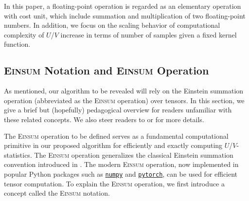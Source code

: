 \documentclass[twoside,11pt]{article}
\def\Einsum{\textsc{Einsum}}
\newcommand{\libref}[2]{\href{#2}{\texttt{#1}}}
\newcommand{\numpy}{\libref{numpy}{https://numpy.org/}}
\newcommand{\torch}{\libref{pytorch}{https://pytorch.org/}}
\begin{document}
In this paper, a floating-point operation is regarded as an elementary operation with cost unit, which include summation and multiplication of two floating-point numbers. In addition, we focus on the scaling behavior of computational complexity of $U$/$V$ increase in terms of number of samples given a fixed kernel function.
\fi

\subsection{{\normalfont\Einsum{}} Notation and {\normalfont\Einsum{}} Operation}
\label{sec:pre_tensor_contraction}

As mentioned, our algorithm to be revealed will rely on the Einstein summation operation (abbreviated as the \Einsum{} operation) over tensors. In this section, we give a brief but (hopefully) pedagogical overview for readers unfamiliar with these related concepts. We also steer readers to \citet{klaus2023compiling} or \citet{blacher2024einsum} for more details. %

The \Einsum{} operation to be defined serves as a fundamental computational primitive in our proposed algorithm for efficiently and exactly computing $U$/$V$-statistics. The \Einsum{} operation generalizes the classical Einstein summation convention introduced in \cite{einstein1916grundlage}. The modern \Einsum{} operation, now implemented in popular Python packages such as \numpy{} and \torch{}, can be used for efficient tensor computation. To explain the \Einsum{} operation, we first introduce a concept called the \Einsum{} notation.
\end{document}
